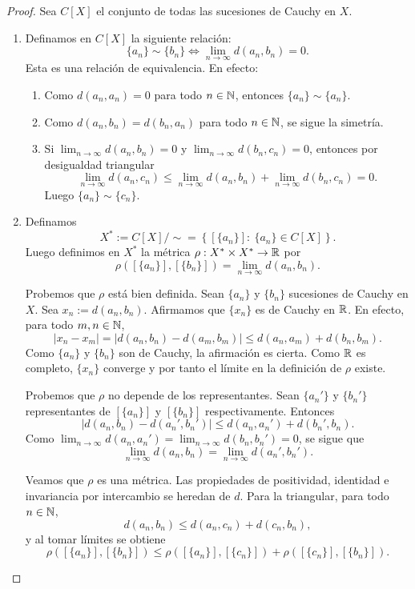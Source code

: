 \begin{proof}
Sea $C[X]$ el conjunto de todas las sucesiones de Cauchy en $X$.
\begin{enumerate}
    \item Definamos en $C[X]$ la siguiente relación:
    \[
    \{a_n\}\sim\{b_n\} \iff \lim_{n\to\infty} d(a_n,b_n)=0.
    \]
    Esta es una relación de equivalencia. En efecto:
    \begin{enumerate}
        \item Como $d(a_n,a_n)=0$ para todo $n\in\mathbb{N}$, entonces $\{a_n\}\sim\{a_n\}$.
        \item Como $d(a_n,b_n)=d(b_n,a_n)$ para todo $n\in\mathbb{N}$, se sigue la simetría.
        \item Si $\lim_{n\to\infty} d(a_n,b_n)=0$ y $\lim_{n\to\infty} d(b_n,c_n)=0$, entonces por desigualdad triangular
        \[
        \lim_{n\to\infty} d(a_n,c_n)
        \le
        \lim_{n\to\infty} d(a_n,b_n)+\lim_{n\to\infty} d(b_n,c_n)=0.
        \]
        Luego $\{a_n\}\sim\{c_n\}$.
    \end{enumerate}

    \item Definamos
    \[
    X^*:=C[X]/\sim=\left\{[\{a_n\}]:\ \{a_n\}\in C[X]\right\}.
    \]
    Luego definimos en $X^*$ la métrica $\rho:X^*\times X^*\to\mathbb{R}$ por
    \[
    \rho([\{a_n\}], [\{b_n\}])=\lim_{n\to\infty} d(a_n,b_n).
    \]

    Probemos que $\rho$ está bien definida. Sean $\{a_n\}$ y $\{b_n\}$ sucesiones de Cauchy en $X$. Sea $x_n:=d(a_n,b_n)$. Afirmamos que $\{x_n\}$ es de Cauchy en $\mathbb{R}$. En efecto, para todo $m,n\in\mathbb{N}$,
    \[
    |x_n-x_m|=|d(a_n,b_n)-d(a_m,b_m)|\le d(a_n,a_m)+d(b_n,b_m).
    \]
    Como $\{a_n\}$ y $\{b_n\}$ son de Cauchy, la afirmación es cierta. Como $\mathbb{R}$ es completo, $\{x_n\}$ converge y por tanto el límite en la definición de $\rho$ existe.

    Probemos que $\rho$ no depende de los representantes. Sean $\{a_n'\}$ y $\{b_n'\}$ representantes de $[\{a_n\}]$ y $[\{b_n\}]$ respectivamente. Entonces
    \[
    |d(a_n,b_n)-d(a_n',b_n')|\le d(a_n,a_n')+d(b_n',b_n).
    \]
    Como $\lim_{n\to\infty}d(a_n,a_n')=\lim_{n\to\infty}d(b_n,b_n')=0$, se sigue que
    \[
    \lim_{n\to\infty}d(a_n,b_n)=\lim_{n\to\infty}d(a_n',b_n').
    \]

    Veamos que $\rho$ es una métrica. Las propiedades de positividad, identidad e invariancia por intercambio se heredan de $d$. Para la triangular, para todo $n\in\mathbb{N}$,
    \[
    d(a_n,b_n)\le d(a_n,c_n)+d(c_n,b_n),
    \]
    y al tomar límites se obtiene
    \[
    \rho([\{a_n\}],[\{b_n\}])\le \rho([\{a_n\}],[\{c_n\}]) + \rho([\{c_n\}],[\{b_n\}]).
    \]


\end{enumerate}
\end{proof}
